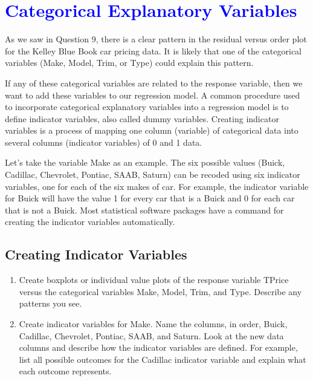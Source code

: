 \documentclass[
]{report}
\begin{document}
\hypertarget{section-31}{%
\section{\texorpdfstring{\textcolor{blue}{Categorical Explanatory Variables}}{}}\label{section-31}}

As we saw in Question 9, there is a clear pattern in the residual versus order plot for the Kelley Blue Book car pricing data. It is likely that one of the categorical variables (Make, Model, Trim, or Type) could explain this pattern.

If any of these categorical variables are related to the response variable, then we want to add these variables to our regression model. A common procedure used to incorporate categorical explanatory variables into a regression model is to define indicator variables, also called dummy variables. Creating indicator variables is a process of mapping one column (variable) of categorical data into several columns (indicator variables) of 0 and 1 data.

Let's take the variable Make as an example. The six possible values (Buick, Cadillac, Chevrolet, Pontiac, SAAB, Saturn) can be recoded using six indicator variables, one for each of the six makes of car. For example, the indicator variable for Buick will have the value 1 for every car that is a Buick and 0 for each car that is not a Buick. Most statistical software packages have a command for creating the indicator variables automatically.

\hypertarget{creating-indicator-variables}{%
\subsection*{Creating Indicator Variables}\label{creating-indicator-variables}}

\begin{enumerate}
\def\labelenumi{\arabic{enumi}.}
\setcounter{enumi}{16}
\item
  Create boxplots or individual value plots of the response variable TPrice versus the categorical variables Make, Model, Trim, and Type. Describe any patterns you see.
\item
  Create indicator variables for Make. Name the columns, in order, Buick, Cadillac, Chevrolet, Pontiac, SAAB, and Saturn. Look at the new data columns and describe how the indicator variables are defined. For example, list all possible outcomes for the Cadillac indicator variable and explain what each outcome
  represents.
\end{enumerate}
\end{document}

